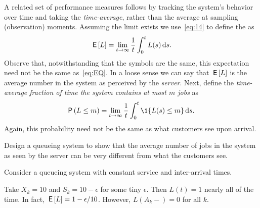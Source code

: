 A related set of performance measures follows by tracking the system's behavior over time and taking the \emph{time-average}, rather than the average at sampling (observation) moments.
Assuming the limit exists we use~\cref{eq:14} to define the  as
\begin{equation}
  \label{eq:46}
  \,\mathsf{E}\left[L\right] = \lim_{t\to\infty} \frac 1 t\int_0^t L(s) \,\text{d}s.
\end{equation}
Observe that, notwithstanding that the symbols are the same, this expectation need not be the same as~\cref{eq:EQ}.
In a loose sense we can say that $\,\mathsf{E}\left[L\right]$ is the average number in the system as perceived by the \emph{server}.
Next, define the \emph{time-average fraction of time the system contains at most $m$ jobs} as
\begin{equation}
  \label{eq:47}
  \P{L\leq m} =\lim_{t\to\infty} \frac 1 t\int_0^t \1{L(s)\leq m} \d s.
\end{equation}
Again, this probability need not be the same as what customers see upon arrival.


\begin{exercise}
Design a queueing system to show that the average number of jobs in the system as seen by the server can be very different from what the customers see.
\begin{hint}
Consider a queueing system with constant service and inter-arrival times.
\end{hint}
\begin{solution}
  Take $X_k = 10$ and $S_k = 10-\epsilon$ for some tiny
  $\epsilon$. Then $L(t) = 1$ nearly all of the time. In fact,
  $\,\mathsf{E}\left[L\right] = 1-\epsilon/10$. However, $L(A_k-)=0$ for all $k$.
\end{solution}
\end{exercise}



